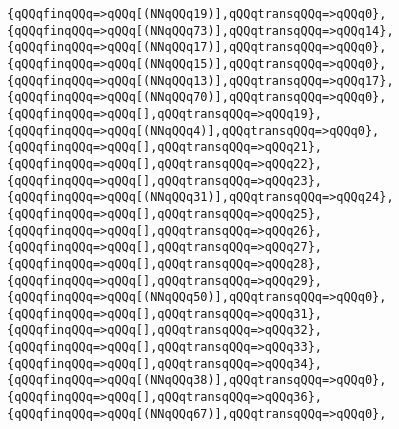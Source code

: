 \verb|{qQQqfinqQQq=>qQQq[(NNqQQq19)],qQQqtransqQQq=>qQQq0},|\newline
\verb|{qQQqfinqQQq=>qQQq[(NNqQQq73)],qQQqtransqQQq=>qQQq14},|\newline
\verb|{qQQqfinqQQq=>qQQq[(NNqQQq17)],qQQqtransqQQq=>qQQq0},|\newline
\verb|{qQQqfinqQQq=>qQQq[(NNqQQq15)],qQQqtransqQQq=>qQQq0},|\newline
\verb|{qQQqfinqQQq=>qQQq[(NNqQQq13)],qQQqtransqQQq=>qQQq17},|\newline
\verb|{qQQqfinqQQq=>qQQq[(NNqQQq70)],qQQqtransqQQq=>qQQq0},|\newline
\verb|{qQQqfinqQQq=>qQQq[],qQQqtransqQQq=>qQQq19},|\newline
\verb|{qQQqfinqQQq=>qQQq[(NNqQQq4)],qQQqtransqQQq=>qQQq0},|\newline
\verb|{qQQqfinqQQq=>qQQq[],qQQqtransqQQq=>qQQq21},|\newline
\verb|{qQQqfinqQQq=>qQQq[],qQQqtransqQQq=>qQQq22},|\newline
\verb|{qQQqfinqQQq=>qQQq[],qQQqtransqQQq=>qQQq23},|\newline
\verb|{qQQqfinqQQq=>qQQq[(NNqQQq31)],qQQqtransqQQq=>qQQq24},|\newline
\verb|{qQQqfinqQQq=>qQQq[],qQQqtransqQQq=>qQQq25},|\newline
\verb|{qQQqfinqQQq=>qQQq[],qQQqtransqQQq=>qQQq26},|\newline
\verb|{qQQqfinqQQq=>qQQq[],qQQqtransqQQq=>qQQq27},|\newline
\verb|{qQQqfinqQQq=>qQQq[],qQQqtransqQQq=>qQQq28},|\newline
\verb|{qQQqfinqQQq=>qQQq[],qQQqtransqQQq=>qQQq29},|\newline
\verb|{qQQqfinqQQq=>qQQq[(NNqQQq50)],qQQqtransqQQq=>qQQq0},|\newline
\verb|{qQQqfinqQQq=>qQQq[],qQQqtransqQQq=>qQQq31},|\newline
\verb|{qQQqfinqQQq=>qQQq[],qQQqtransqQQq=>qQQq32},|\newline
\verb|{qQQqfinqQQq=>qQQq[],qQQqtransqQQq=>qQQq33},|\newline
\verb|{qQQqfinqQQq=>qQQq[],qQQqtransqQQq=>qQQq34},|\newline
\verb|{qQQqfinqQQq=>qQQq[(NNqQQq38)],qQQqtransqQQq=>qQQq0},|\newline
\verb|{qQQqfinqQQq=>qQQq[],qQQqtransqQQq=>qQQq36},|\newline
\verb|{qQQqfinqQQq=>qQQq[(NNqQQq67)],qQQqtransqQQq=>qQQq0},|\newline
